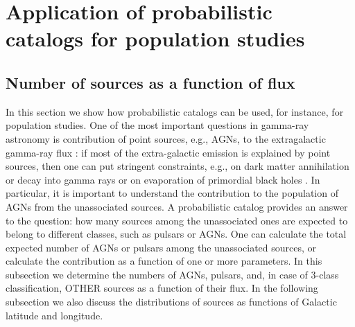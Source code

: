 \section{Application of probabilistic catalogs for population studies}

\subsection{Number of sources as a function of flux}


In this section we show how probabilistic catalogs can be used, for instance, for population studies.
One of the most important questions in gamma-ray astronomy is contribution of point sources, 
e.g., AGNs, to the extragalactic gamma-ray flux 
\citep[e.g.,][]{2010ApJ...720..435A, 2011ApJ...738..181M, 2016PhRvL.116o1105A, 2016ApJS..225...18Z, 2016ApJ...826L..31Z, 2016ApJ...832..117L, 2018ApJ...856..106D}:
if most of the extra-galactic emission is explained by point sources, then one can put stringent constraints, 
e.g., on  dark matter annihilation or decay into gamma rays 
\citep{2015ApJ...800L..27A, 2015PhRvD..91l3001D, 2015JCAP...09..008F, 2015PhR...598....1F, 2017ChPhC..41d5104L} or 
on evaporation of primordial black holes \citep{2010PhRvD..81j4019C}.
In particular, it is important to understand the contribution to the population of AGNs from the unassociated sources.
A probabilistic catalog provides an answer to the question: how many sources among the unassociated ones are expected to belong to different classes, such as pulsars or AGNs. 
One can calculate the total expected number of AGNs or pulsars among the unassociated sources, or calculate the contribution as a function of one or more parameters.
In this subsection we determine the numbers of AGNs, pulsars, and, in case of 3-class classification, OTHER sources as a function of their flux.
In the following subsection we also discuss the distributions of sources as functions
of Galactic latitude and longitude.



